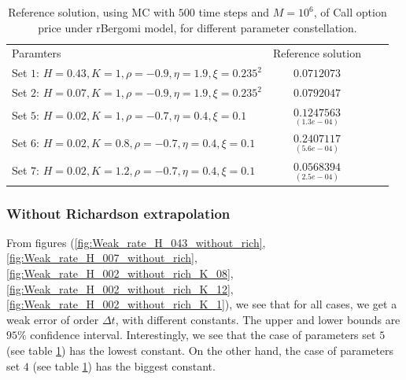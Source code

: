 \documentclass[11pt]{article}
\begin{document}
\begin{table}[!h]
	\centering
	\begin{tabular}{l*{2}{c}r}
		Paramters            & Reference solution    \\
	Set $1$:	$H=0.43, K=1, \rho=-0.9, \eta=1.9,\xi=0.235^2$   & $\underset{}{0.0712073}$  \\	
			Set $2$:	$H=0.07, K=1, \rho=-0.9, \eta=1.9,\xi=0.235^2$   & $\underset{}{0.0792047}$  \\	
				Set $5$:	$H=0.02, K=1, \rho=-0.7, \eta=0.4,\xi=0.1$   & $\underset{(1.3e-04)}{0.1247563}$  \\
					Set $6$:	$H=0.02, K=0.8, \rho=-0.7, \eta=0.4,\xi=0.1$   & $\underset{(5.6e-04)}{0.2407117}$  \\
						Set $7$:	$H=0.02, K=1.2, \rho=-0.7, \eta=0.4,\xi=0.1$   & $\underset{(2.5e-04)}{0.0568394}$  \\
		\hline
	\end{tabular}
	\caption{Reference solution, using MC with $500$ time steps and $M=10^6$, of Call option price under rBergomi model, for different parameter constellation.}
	\label{table:Reference solution, using MC with $500$ time steps, of Call option price under rBergomi model, for different parameter constellation.}
\end{table}
\FloatBarrier


\subsubsection{Without Richardson extrapolation}
From figures (\ref{fig:Weak_rate_H_043_without_rich},\ref{fig:Weak_rate_H_007_without_rich},\ref{fig:Weak_rate_H_002_without_rich_K_08},\ref{fig:Weak_rate_H_002_without_rich_K_12},\ref{fig:Weak_rate_H_002_without_rich_K_1}), we see that for all cases, we get a weak error of order $\Delta t$, with different  constants. The upper and lower bounds are $95\%$ confidence interval. Interestingly, we see that the case of parameters set $5$ (see table \ref{table:Reference solution, using MC with $500$ time steps, of Call option price under rBergomi model, for different parameter constellation.}) has the lowest constant. On the other hand, the case of parameters set $4$ (see table \ref{table:Reference solution, using MC with $500$ time steps, of Call option price under rBergomi model, for different parameter constellation.}) has the biggest constant.
\end{document}
